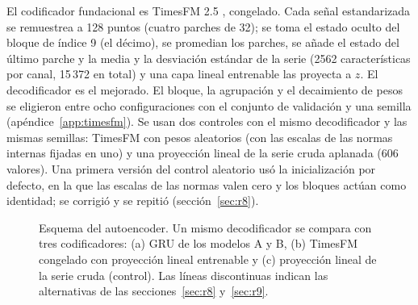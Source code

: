 \documentclass[11pt,a4paper]{article}
\begin{document}
El codificador fundacional es TimesFM 2.5 \cite{das2024timesfm,timesfm25}, congelado. Cada señal estandarizada se remuestrea a 128 puntos (cuatro parches de 32); se toma el estado oculto del bloque de índice 9 (el décimo), se promedian los parches, se añade el estado del último parche y la media y la desviación estándar de la serie (2562 características por canal, 15\,372 en total) y una capa lineal entrenable las proyecta a $z$. El decodificador es el mejorado. El bloque, la agrupación y el decaimiento de pesos se eligieron entre ocho configuraciones con el conjunto de validación y una semilla (apéndice~\ref{app:timesfm}). Se usan dos controles con el mismo decodificador y las mismas semillas: TimesFM con pesos aleatorios (con las escalas de las normas internas fijadas en uno) y una proyección lineal de la serie cruda aplanada (606 valores). Una primera versión del control aleatorio usó la inicialización por defecto, en la que las escalas de las normas valen cero y los bloques actúan como identidad; se corrigió y se repitió (sección~\ref{sec:r8}).

\begin{figure}[h]
\centering
{}
\caption{Esquema del autoencoder. Un mismo decodificador se compara con tres codificadores: (a) GRU de los modelos A y B, (b) TimesFM congelado con proyección lineal entrenable y (c) proyección lineal de la serie cruda (control). Las líneas discontinuas indican las alternativas de las secciones~\ref{sec:r8} y~\ref{sec:r9}.}
\label{fig:esquema}
\end{figure}
\end{document}
